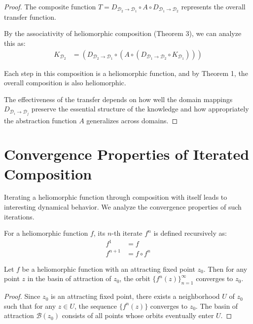 \begin{definition}
\begin{enumerate}
\begin{definition}
\begin{definition}
\begin{proof}
The composite function $T = D_{\mathcal{D}_2 \to \mathcal{D}_1} \circ A \circ D_{\mathcal{D}_1 \to \mathcal{D}_2}$ represents the overall transfer function.

By the associativity of heliomorphic composition (Theorem 3), we can analyze this as:
\begin{align}
K_{\mathcal{D}_2} &= (D_{\mathcal{D}_2 \to \mathcal{D}_1} \circ (A \circ (D_{\mathcal{D}_1 \to \mathcal{D}_2} \circ K_{\mathcal{D}_1})))
\end{align}

Each step in this composition is a heliomorphic function, and by Theorem 1, the overall composition is also heliomorphic.

The effectiveness of the transfer depends on how well the domain mappings $D_{\mathcal{D}_i \to \mathcal{D}_j}$ preserve the essential structure of the knowledge and how appropriately the abstraction function $A$ generalizes across domains.
\end{proof}

\section{Convergence Properties of Iterated Composition}

Iterating a heliomorphic function through composition with itself leads to interesting dynamical behavior. We analyze the convergence properties of such iterations.

\begin{definition}
For a heliomorphic function $f$, its $n$-th iterate $f^n$ is defined recursively as:
\begin{align}
f^1 &= f\\
f^{n+1} &= f \circ f^n
\end{align}
\end{definition}

\begin{theorem}
Let $f$ be a heliomorphic function with an attracting fixed point $z_0$. Then for any point $z$ in the basin of attraction of $z_0$, the orbit $\{f^n(z)\}_{n=1}^{\infty}$ converges to $z_0$.
\end{theorem}

\begin{proof}
Since $z_0$ is an attracting fixed point, there exists a neighborhood $U$ of $z_0$ such that for any $z \in U$, the sequence $\{f^n(z)\}$ converges to $z_0$. The basin of attraction $\mathcal{B}(z_0)$ consists of all points whose orbits eventually enter $U$.


\end{proof}
\end{definition}
\end{definition}
\end{enumerate}
\end{definition}
